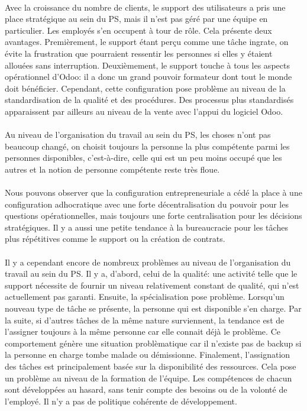 \paragraph{} Avec la croissance du nombre de clients, le support des utilisateurs a pris une place stratégique au sein du PS, mais il n'est pas géré par une équipe en particulier. Les employés s'en occupent à tour de rôle. Cela présente deux avantages. Premièrement, le support étant perçu comme une tâche ingrate, on évite la frustration que pourraient ressentir les personnes si elles y étaient allouées sans interruption. Deuxièmement, le support touche à tous les aspects opérationnel d'Odoo: il a donc un grand pouvoir formateur dont tout le monde doit bénéficier. Cependant, cette configuration pose problème au niveau de la standardisation de la qualité et des procédures. Des processus plus standardisés apparaissent par ailleurs au niveau de la vente avec l'appui du logiciel Odoo. 

\paragraph{} Au niveau de l'organisation du travail au sein du PS, les choses n'ont pas beaucoup changé, on choisit toujours la personne la plus compétente parmi les personnes disponibles, c'est-à-dire, celle qui est un peu moins occupé que les autres et la notion de personne compétente reste très floue. 

\paragraph{} Nous pouvons observer que la configuration entrepreneuriale a cédé la place à une configuration adhocratique\citep[pp. 53-54]{pichault} avec une forte décentralisation du pouvoir pour les questions opérationnelles, mais toujours une forte centralisation pour les décisions stratégiques. Il y a aussi une petite tendance à la bureaucracie pour les tâches plus répétitives comme le support ou la création de contrats. 

\paragraph{}Il y a cependant encore de nombreux problèmes au niveau de l'organisation du travail au sein du PS. Il y a, d'abord, celui de la qualité: une activité telle que le support nécessite de fournir un niveau relativement constant de qualité, qui n'est actuellement pas garanti. Ensuite, la spécialisation pose problème. Lorsqu'un nouveau type de tâche se présente, la personne qui est disponible s'en charge. Par la suite, si d'autres tâches de la même nature surviennent, la tendance est de l'assigner toujours à la même personne car elle connait déjà le problème. Ce comportement génère une situation problèmatique car il n'existe pas de backup si la personne en charge tombe malade ou démissionne. 
Finalement, l'assignation des tâches est principalement basée sur la disponibilité des ressources. Cela pose un problème au niveau de la formation de l'équipe. Les compétences de chacun sont développées au hasard, sans tenir compte des besoins ou de la volonté de l'employé. Il n'y a pas de politique cohérente de développement.


